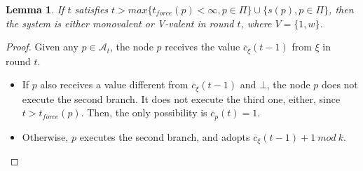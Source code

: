 \documentclass{article}
\newtheorem{lemma}{Lemma}[section]
\begin{document}
\begin{lemma}\label{lem:mono_bi}
	If $t$ satisfies $t > max \{t_{force}(p) < \infty, p \in \Pi\} \cup \{s(p), p \in \Pi\}$,
	then the system is either monovalent or V-valent in round $t$, where $V = \{1, w\}$.
\end{lemma}
\begin{proof}
	Given any $p \in \mathcal{A}_t$, the node $p$ receives the value $\overline{c}_\xi(t-1)$ from $\xi$ in round $t$.
	\begin{itemize}
		\item If $p$ also receives a value different from $\overline{c}_\xi(t-1)$ and $\bot$, the node $p$ does not 
			execute the second branch. It does not execute the third one, either, since $t > t_{force}(p)$.
			Then, the only possibility is $\overline{c}_p(t) = 1$.
		\item Otherwise, $p$ executes the second branch, and adopts $\overline{c}_\xi(t-1)+1~mod~k$.
	\end{itemize}
\end{proof}
\end{document}
